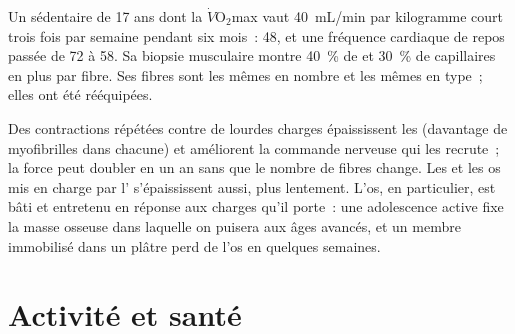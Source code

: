 \begin{example}\label{ex:g10:sport-and-health:numbers}
Un sédentaire de 17 ans dont la $\dot V\!\mathrm{O_2}$max vaut
\qty{40}{mL/min} par kilogramme court trois fois par semaine pendant
six mois~: \num{48}, et une fréquence cardiaque de repos passée de 72 à
58. Sa biopsie musculaire montre 40~\% de  et 30~\% de
capillaires en plus par fibre. Ses fibres sont les mêmes en nombre et
les mêmes en type~; elles ont été rééquipées.
\end{example}

\begin{proposition}\label{prop:g10:sport-and-health:strength}
Des contractions répétées contre de lourdes charges épaississent les
 (davantage de myofibrilles dans chacune) et
améliorent la commande nerveuse qui les recrute~; la force peut doubler
en un an sans que le nombre de fibres change. Les  et les os
mis en charge par l' s'épaississent aussi, plus lentement.
L'os, en particulier, est bâti et entretenu en réponse aux charges
qu'il porte~: une adolescence active fixe la masse osseuse dans
laquelle on puisera aux âges avancés, et un membre immobilisé dans un
plâtre perd de l'os en quelques semaines.
\end{proposition}
\admitted

\section{Activité et santé}


